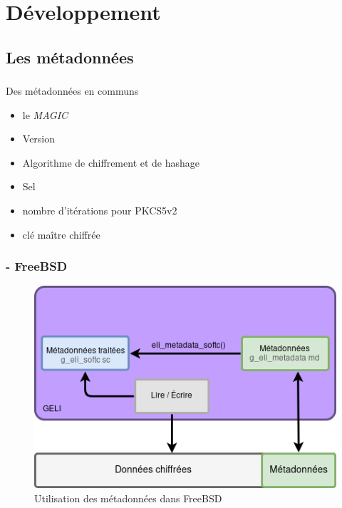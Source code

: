 \section{Développement}

\subsection{Les métadonnées}

\begin{frame}
	\frametitle{\insertsubsectionhead}
	\pause
	\begin{block}{Des métadonnées en communs}
		\begin{itemize}
			\pause
		\item le \textit{MAGIC}
		\item Version
		\item Algorithme de chiffrement et de hashage
		\item Sel
		\item nombre d'itérations pour PKCS5v2
		\item clé maître chiffrée
		\end{itemize}
	\end{block}
\end{frame}

\begin{frame}
	\frametitle{\insertsubsectionhead - \textbf{FreeBSD}}
	\begin{figure}
		\includegraphics[width=.8\textwidth]{developpement/utilisation_metadonnee}
		\caption{Utilisation des métadonnées dans FreeBSD}
	\end{figure}
\end{frame}

